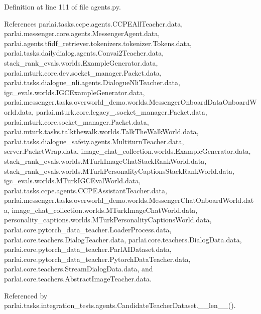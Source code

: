 Definition at line 111 of file agents.\+py.



References parlai.\+tasks.\+ccpe.\+agents.\+C\+C\+P\+E\+All\+Teacher.\+data, parlai.\+messenger.\+core.\+agents.\+Messenger\+Agent.\+data, parlai.\+agents.\+tfidf\+\_\+retriever.\+tokenizers.\+tokenizer.\+Tokens.\+data, parlai.\+tasks.\+dailydialog.\+agents.\+Convai2\+Teacher.\+data, stack\+\_\+rank\+\_\+evals.\+worlds.\+Example\+Generator.\+data, parlai.\+mturk.\+core.\+dev.\+socket\+\_\+manager.\+Packet.\+data, parlai.\+tasks.\+dialogue\+\_\+nli.\+agents.\+Dialogue\+Nli\+Teacher.\+data, igc\+\_\+evals.\+worlds.\+I\+G\+C\+Example\+Generator.\+data, parlai.\+messenger.\+tasks.\+overworld\+\_\+demo.\+worlds.\+Messenger\+Onboard\+Data\+Onboard\+World.\+data, parlai.\+mturk.\+core.\+legacy\+\_.\+socket\+\_\+manager.\+Packet.\+data, parlai.\+mturk.\+core.\+socket\+\_\+manager.\+Packet.\+data, parlai.\+mturk.\+tasks.\+talkthewalk.\+worlds.\+Talk\+The\+Walk\+World.\+data, parlai.\+tasks.\+dialogue\+\_\+safety.\+agents.\+Multiturn\+Teacher.\+data, server.\+Packet\+Wrap.\+data, image\+\_\+chat\+\_\+collection.\+worlds.\+Example\+Generator.\+data, stack\+\_\+rank\+\_\+evals.\+worlds.\+M\+Turk\+Image\+Chat\+Stack\+Rank\+World.\+data, stack\+\_\+rank\+\_\+evals.\+worlds.\+M\+Turk\+Personality\+Captions\+Stack\+Rank\+World.\+data, igc\+\_\+evals.\+worlds.\+M\+Turk\+I\+G\+C\+Eval\+World.\+data, parlai.\+tasks.\+ccpe.\+agents.\+C\+C\+P\+E\+Assistant\+Teacher.\+data, parlai.\+messenger.\+tasks.\+overworld\+\_\+demo.\+worlds.\+Messenger\+Chat\+Onboard\+World.\+data, image\+\_\+chat\+\_\+collection.\+worlds.\+M\+Turk\+Image\+Chat\+World.\+data, personality\+\_\+captions.\+worlds.\+M\+Turk\+Personality\+Captions\+World.\+data, parlai.\+core.\+pytorch\+\_\+data\+\_\+teacher.\+Loader\+Process.\+data, parlai.\+core.\+teachers.\+Dialog\+Teacher.\+data, parlai.\+core.\+teachers.\+Dialog\+Data.\+data, parlai.\+core.\+pytorch\+\_\+data\+\_\+teacher.\+Parl\+A\+I\+Dataset.\+data, parlai.\+core.\+pytorch\+\_\+data\+\_\+teacher.\+Pytorch\+Data\+Teacher.\+data, parlai.\+core.\+teachers.\+Stream\+Dialog\+Data.\+data, and parlai.\+core.\+teachers.\+Abstract\+Image\+Teacher.\+data.



Referenced by parlai.\+tasks.\+integration\+\_\+tests.\+agents.\+Candidate\+Teacher\+Dataset.\+\_\+\+\_\+len\+\_\+\+\_\+().

